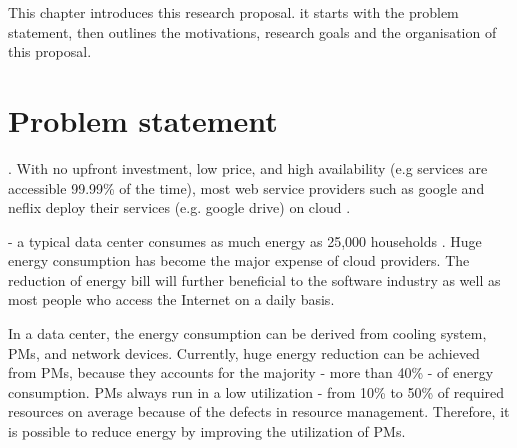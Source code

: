 This chapter introduces this research proposal. it starts with the problem statement, then outlines the motivations, research goals and the organisation of this proposal.

\section{Problem statement}

. With no upfront investment, low price, and high availability (e.g services are accessible 99.99\% of the time), most web service providers such as google and neflix deploy their services (e.g. google drive) on cloud \cite{adhikari:2012uq}. 

 - a typical data center consumes as much energy as 25,000 households \cite{dayarathna:2016ua}. Huge energy consumption has become the major expense of cloud providers. The reduction of energy bill will further beneficial to the software industry as well as most people who access the Internet on a daily basis.

 In a data center, the energy consumption can be derived from cooling system, PMs, and network devices. Currently, huge energy reduction can be achieved from PMs, because they accounts for the majority - more than 40\% - of energy consumption. PMs always run in a low utilization \cite{Barroso:2007jt, Shen:2015hm} - from 10\% to 50\% of required resources on average because of the defects in resource management. Therefore, it is possible to reduce energy by improving the utilization of PMs.

